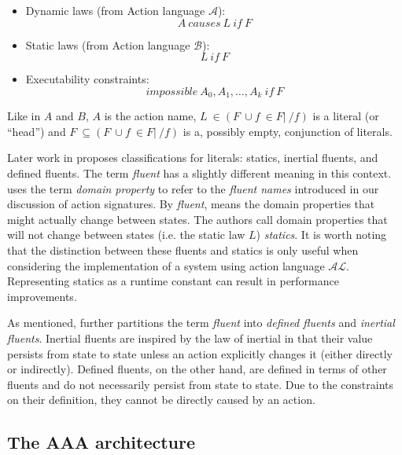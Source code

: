 \begin{itemize}
    \item Dynamic laws (from Action language $ \mathcal{A} $):
        $$
        A\ causes\ L\ if\ F
        $$

    \item Static laws (from Action language $ \mathcal{B} $):
        $$
        L\ if\ F
        $$

    \item Executability constraints:
        $$
        impossible\ A_0, A_1, \dots, A_k\ if\ F
        $$
\end{itemize}

Like in $A$ and $B$, $A$ is the action name, $L\ \in(F\ \cup{f\ \in F|\ /f}) $ is a literal (or ``head'') and $F\ \subseteq(F\ \cup{f\ \in F|\ /f})$ is a, possibly empty, conjunction of literals.

Later work in \cite{gelfond_knowledge_2014} proposes classifications for literals: statics, inertial fluents, and defined fluents.
The term \textit{fluent} has a slightly different meaning in this context.
\cite{gelfond_knowledge_2014} uses the term \textit{domain property} to refer to the \textit{fluent names} introduced in our discussion of action signatures.
By \textit{fluent}, \cite{gelfond_knowledge_2014} means the domain properties that might actually change between states.
The authors call domain properties that will not change between states (i.e. the static law $L$) \textit{statics}.
It is worth noting that the distinction between these fluents and statics is only useful when considering the implementation of a system using action language $\mathcal{AL}$.
Representing statics as a runtime constant can result in performance improvements.

As mentioned, \cite{gelfond_knowledge_2014} further partitions the term \textit{fluent} into \textit{defined fluents} and \textit{inertial fluents}.
Inertial fluents are inspired by the law of inertial in that their value persists from state to state unless an action explicitly changes it (either directly or indirectly).
Defined fluents, on the other hand, are defined in terms of other fluents and do not necessarily persist from state to state.
Due to the constraints on their definition, they cannot be directly caused by an action.


\subsection{The AAA architecture}
\label{subsec:aaa_architecture}

